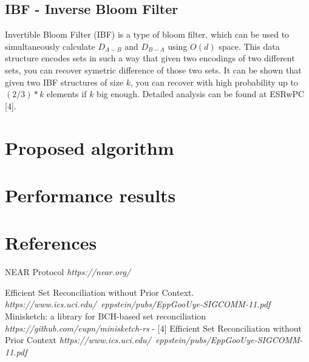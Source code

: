 \documentclass[11pt]{article}
\begin{document}
\subsection{IBF - Inverse Bloom Filter}
Invertible Bloom Filter (IBF) is a type of bloom filter, which can be used to simultaneously calculate  $D_{A-B}$ and $D_{B-A}$ using $O(d)$ space.
This data structure encodes sets in such a way that given two encodings  of two different sets, you can recover symetric difference of those two sets.
It can be shown that given two IBF structures of size $k$, you can recover with high probability up to $(2/3)*k$ elements if $k$ big enough.
Detailed analysis can be found at ESRwPC [4].

\section{Proposed algorithm}

\section{Performance results}


\section{References}

\begin{thebibliography}{9}
NEAR Protocol
\textit{https://near.org/}

Efficient Set Reconciliation without Prior Context. 
\textit{https://www.ics.uci.edu/~eppstein/pubs/EppGooUye-SIGCOMM-11.pdf}
Minisketch: a library for BCH-based set reconciliation
\textit{https://github.com/eupn/minisketch-rs}
- [4] Efficient Set Reconciliation without Prior Context 
\textit{https://www.ics.uci.edu/~eppstein/pubs/EppGooUye-SIGCOMM-11.pdf}

\end{thebibliography}
\end{document}
